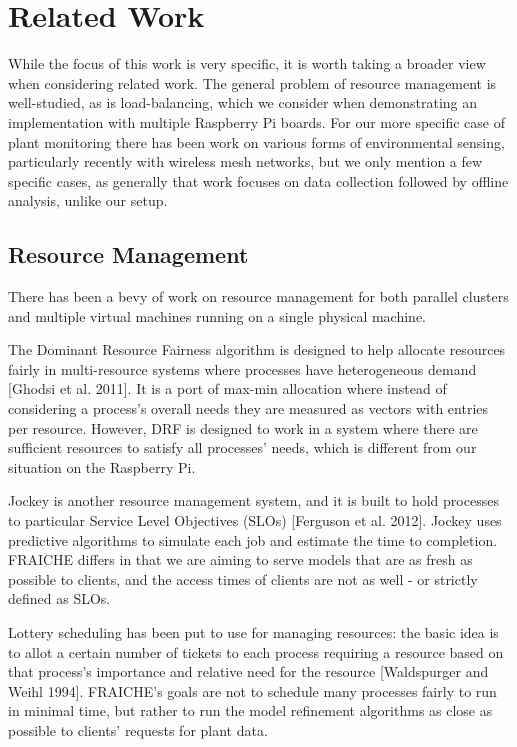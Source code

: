 \documentclass[a4paper]{acm_proc_article-sp}
\begin{document}
\section{Related Work}

While the focus of this work is very specific, it is worth taking a broader view when considering related work.  The general problem of resource management is well-studied, as is load-balancing, which we consider when demonstrating an implementation with multiple Raspberry Pi boards.  For our more specific case of plant monitoring there has been work on various forms of environmental sensing, particularly recently with wireless mesh networks, but we only mention a few specific cases, as generally that work focuses on data collection followed by offline analysis, unlike our setup.

\subsection{Resource Management}
There has been a bevy of work on resource management for both parallel clusters and multiple virtual machines running on a single physical machine.

The Dominant Resource Fairness algorithm is designed to help allocate resources fairly in multi-resource systems where processes have heterogeneous demand [Ghodsi et al. 2011]. It is a port of max-min allocation where instead of considering a process's overall needs they are measured as vectors with entries per resource.  However, DRF is designed to work in a system where there are sufficient resources to satisfy all processes' needs, which is different from our situation on the Raspberry Pi.

Jockey is another resource management system, and it is built to hold processes to particular Service Level Objectives (SLOs) [Ferguson et al. 2012].  Jockey uses predictive algorithms to simulate each job and estimate the time to completion. FRAICHE differs in that we are aiming to serve models that are as fresh as possible to clients, and the access times of clients are not as well - or strictly defined as SLOs.

Lottery scheduling has been put to use for managing resources: the basic idea is to allot a certain number of tickets to each process requiring a resource based on that process's importance and relative need for the resource [Waldspurger and Weihl 1994]. FRAICHE's goals are not to schedule many processes fairly to run in minimal time, but rather to run the model refinement algorithms as close as possible to clients' requests for plant data.
\end{document}
